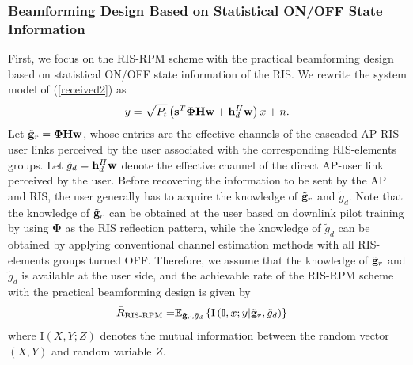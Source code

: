 \documentclass[draftclsnofoot,onecolumn,12pt]{IEEEtran}
\newcommand{\rev}[1]{{\color{red}#1}} %
\newcommand{\rev}[1]{#1}
\begin{document}
\subsubsection{Beamforming Design Based on Statistical ON/OFF State Information}

First, we focus on the RIS-RPM scheme with the practical beamforming design based on statistical ON/OFF state information of the RIS. 
We rewrite the system model of (\ref{received2}) as
\begin{align}
y=\sqrt{P_t}\left({\bf s}^T {\bm \Phi} {\bf H} {\bf w} + {\bf h}_d^H {\bf w} \right) x + n .
\end{align}
Let ${\tilde{\bf g}}_r={\bm \Phi} {\bf H}  {\bf w}$, whose entries are the effective channels of the cascaded AP-RIS-user links perceived by the user associated with the corresponding RIS-elements groups. 
Let ${\tilde{g}}_d= {\bf h}_d^H {\bf w}$ denote the effective channel of the direct AP-user link perceived by the user. 
Before recovering the information to be sent by the AP and RIS, the user generally has to acquire the knowledge of ${\tilde{\bf g}}_r$ and ${\tilde{g}}_d$. 
Note that the knowledge of ${\tilde{\bf g}}_r$ can be obtained at the user based on downlink pilot training by using ${\bm \Phi}$ as the RIS reflection pattern, 
while the knowledge of ${\tilde{g}}_d$ can be obtained by applying conventional channel estimation methods with all RIS-elements groups turned OFF. 
Therefore, we assume that the knowledge of $\tilde{\bf g}_r$ and $\tilde{ g}_d$ is available at the user side, and the achievable rate of the RIS-RPM scheme with the practical beamforming design is given by
\begin{align}\label{dif-mi}
\bar{R}_\text{RIS-RPM}=&\mathbb{E}_{\tilde{\bf g}_r,\tilde{ g}_d}\left\{\text{I}\left(\mathbb{I},x;y|\tilde{\bf g}_r,\tilde{ g}_d\right)\right\} 
\end{align}
where $\text{I}\left(X,Y;Z\right)$ denotes the mutual information between the random vector $(X,Y)$ and random variable $Z$. 
\end{document}
